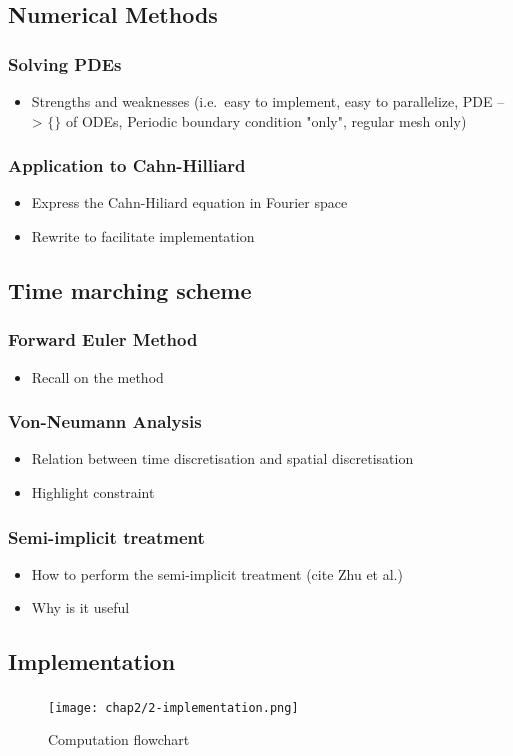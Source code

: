 \subsection{Numerical Methods}
    \subsubsection{Solving PDEs}
    \begin{itemize}
        \item Strengths and weaknesses (i.e.\ easy to implement, easy to parallelize, PDE --> $\{\}$ of ODEs, Periodic boundary condition "only", regular mesh only)
    \end{itemize}
    \subsubsection{Application to Cahn-Hilliard}
    \begin{itemize}
        \item Express the Cahn-Hiliard equation in Fourier space
        \item Rewrite to facilitate implementation
    \end{itemize}
\subsection{Time marching scheme}
    \subsubsection{Forward Euler Method}
    \begin{itemize}
        \item Recall on the method
    \end{itemize}
    \subsubsection{Von-Neumann Analysis}
    \begin{itemize}
        \item Relation between time discretisation and spatial discretisation
        \item Highlight constraint
    \end{itemize}
    \subsubsection{Semi-implicit treatment}
    \begin{itemize}
        \item How to perform the semi-implicit treatment (cite Zhu et al.)
        \item Why is it useful
    \end{itemize}
\subsection{Implementation}
    \subsubsection{}
    \begin{figure}[H]
        \centering
        \texttt{[image: chap2/2-implementation.png]}
        \caption{Computation flowchart}
        \label{fig:t}
    \end{figure}
